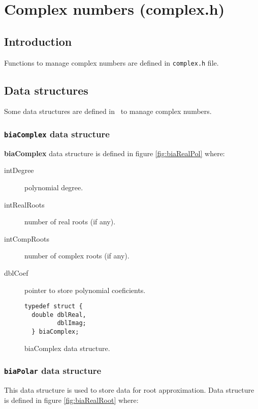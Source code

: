 %
%

\chapter{Complex numbers (complex.h)}

\section{Introduction}

Functions to manage complex numbers are defined in \texttt{complex.h} file.

\section{Data structures}

Some data structures are defined in \BI \ to manage complex numbers.

\subsection{\texttt{biaComplex} data structure} \label{sec:biaComplex}

\textbf{biaComplex} data structure is defined in figure \ref{fig:biaRealPol} where:

\begin{description}
\item[intDegree] polynomial degree.
\item[intRealRoots] number of real roots (if any).
\item[intCompRoots] number of complex roots (if any).
\item[dblCoef] pointer to store polynomial coeficients.
\end{description}

\begin{figure}[!h]
\begin{verbatim}
typedef struct {
  double dblReal,
         dblImag;
  } biaComplex;
\end{verbatim}
\caption{biaComplex data structure.} \label{fig:biaComplex}
\end{figure}

\subsection{\texttt{biaPolar} data structure} \label{sec:biaPolar}

This data structure is used to store data for root approximation. Data structure is defined in figure \ref{fig:biaRealRoot} where:

